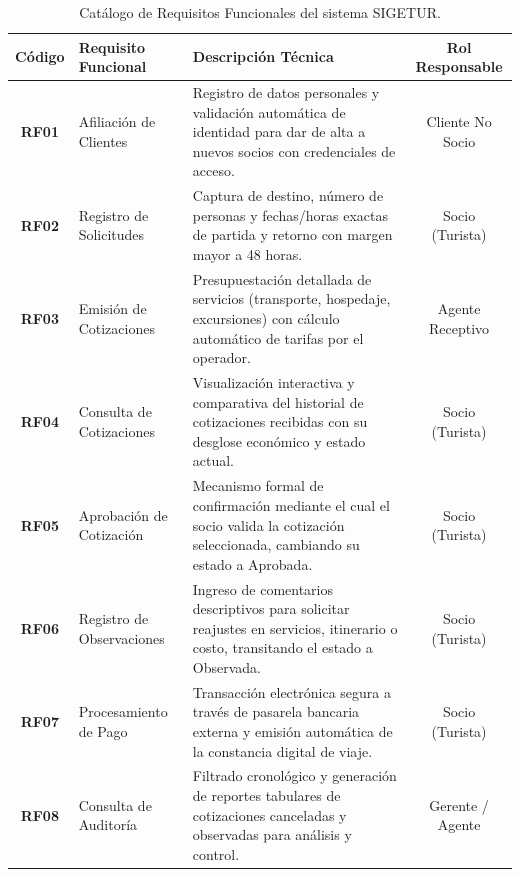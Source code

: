 \begin{table}[H]
\centering
\footnotesize
\begin{tabularx}{\textwidth}{clLc}
\toprule
\textbf{Código} & \textbf{Requisito Funcional} & \textbf{Descripción Técnica} & \textbf{Rol Responsable} \\ \midrule
\textbf{RF01} & Afiliación de Clientes & Registro de datos personales y validación automática de identidad para dar de alta a nuevos socios con credenciales de acceso. & Cliente No Socio \\ \midrule
\textbf{RF02} & Registro de Solicitudes & Captura de destino, número de personas y fechas/horas exactas de partida y retorno con margen mayor a 48 horas. & Socio (Turista) \\ \midrule
\textbf{RF03} & Emisión de Cotizaciones & Presupuestación detallada de servicios (transporte, hospedaje, excursiones) con cálculo automático de tarifas por el operador. & Agente Receptivo \\ \midrule
\textbf{RF04} & Consulta de Cotizaciones & Visualización interactiva y comparativa del historial de cotizaciones recibidas con su desglose económico y estado actual. & Socio (Turista) \\ \midrule
\textbf{RF05} & Aprobación de Cotización & Mecanismo formal de confirmación mediante el cual el socio valida la cotización seleccionada, cambiando su estado a Aprobada. & Socio (Turista) \\ \midrule
\textbf{RF06} & Registro de Observaciones & Ingreso de comentarios descriptivos para solicitar reajustes en servicios, itinerario o costo, transitando el estado a Observada. & Socio (Turista) \\ \midrule
\textbf{RF07} & Procesamiento de Pago & Transacción electrónica segura a través de pasarela bancaria externa y emisión automática de la constancia digital de viaje. & Socio (Turista) \\ \midrule
\textbf{RF08} & Consulta de Auditoría & Filtrado cronológico y generación de reportes tabulares de cotizaciones canceladas y observadas para análisis y control. & Gerente / Agente \\ \bottomrule
\end{tabularx}
\caption{Catálogo de Requisitos Funcionales del sistema SIGETUR.}\label{tab:rf}
\end{table}

